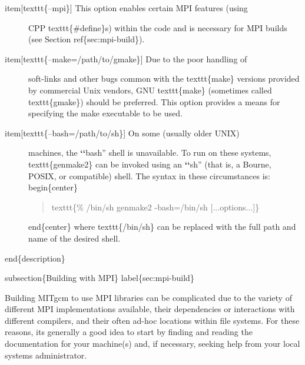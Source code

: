 \documentclass[letterpaper,10pt,english]{sphinxmanual}
\begin{document}
\begin{description}
\item[{item{[}texttt\{--mpi\}{]} This option enables certain MPI features (using}] \leavevmode
CPP texttt\{\#define\}s) within the code and is necessary for MPI
builds (see Section ref\{sec:mpi-build\}).

\item[{item{[}texttt\{--make=/path/to/gmake\}{]} Due to the poor handling of}] \leavevmode
soft-links and other bugs common with the texttt\{make\} versions
provided by commercial Unix vendors, GNU texttt\{make\} (sometimes
called texttt\{gmake\}) should be preferred.  This option provides a
means for specifying the make executable to be used.

\item[{item{[}texttt\{--bash=/path/to/sh\}{]} On some (usually older UNIX)}] \leavevmode
machines, the {\color{red}\bfseries{}{}`{}`}bash'' shell is unavailable.  To run on these
systems, texttt\{genmake2\} can be invoked using an {\color{red}\bfseries{}{}`{}`}sh'' (that is,
a Bourne, POSIX, or compatible) shell.  The syntax in these
circumstances is:
begin\{center\}
\begin{quote}

texttt\{\%  /bin/sh genmake2 -bash=/bin/sh {[}...options...{]}\}
\end{quote}

end\{center\}
where texttt\{/bin/sh\} can be replaced with the full path and name
of the desired shell.

\end{description}

end\{description\}

subsection\{Building with MPI\}
label\{sec:mpi-build\}

Building MITgcm to use MPI libraries can be complicated due to the
variety of different MPI implementations available, their dependencies
or interactions with different compilers, and their often ad-hoc
locations within file systems.  For these reasons, its generally a
good idea to start by finding and reading the documentation for your
machine(s) and, if necessary, seeking help from your local systems
administrator.
\end{document}
